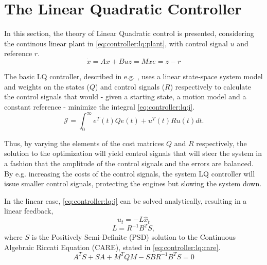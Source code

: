 \section{The Linear Quadratic Controller}
\label{sec:controller:lq}
    In this section, the theory of Linear Quadratic control is presented,
    considering the continous linear plant in \eqref{eq:controller:lq:plant},
    with control signal $u$ and reference $r$.
    \begin{subequations}
        \label{eq:controller:lq:plant}
        \begin{equation}
            \dot{x} = Ax + Bu
        \end{equation}
        \begin{equation}
            z = Mx
        \end{equation}
        \begin{equation}
            e = z - r
        \end{equation}
    \end{subequations}

    The basic LQ controller, described in e.g. \citep{glad2003reglerteori},
    uses a linear state-space system model and weights on the states ($Q$) and control
    signals ($R$) respectively to calculate the control signals that would
    - given a starting state, a motion model and a constant reference -
    minimize the integral \eqref{eq:controller:lq:j}.
    \begin{equation}
    \label{eq:controller:lq:j}
        \mathcal{J} = \int_{0}^{\infty} e^{T}(t)Qe(t) + u^{T}(t)Ru(t) dt.
    \end{equation}

    Thus, by varying the elements of the cost matrices $Q$ and $R$
    respectively, the solution to the optimization will yield control
    signals that will steer the system in a fashion that the amplitude
    of the control signals and the errors are balanced.
    By e.g. increasing the costs of the control signals, the system
    LQ controller will issue smaller control signals, protecting the
    engines but slowing the system down.

    In the linear case, \eqref{eq:controller:lq:j} can be solved analytically,
    resulting in a linear feedback,
    \begin{equation}
    \label{eq:controller:u1}
        u_{t} = -L\hat{x}_{t}
    \end{equation}
    \begin{equation}
    \label{eq:controller:L}
        L = R^{-1}B^{T}S,
    \end{equation}
    where $S$ is the Positively Semi-Definite (PSD) solution to the
    Continuous Algebraic Riccati Equation (CARE)\citep{glad2003reglerteori}, stated in \eqref{eq:controller:lq:care}.
    \begin{equation}
        \label{eq:controller:lq:care}
        A^{T}S + SA + M^{T}QM - SBR^{-1}B^{T}S = 0
    \end{equation}

